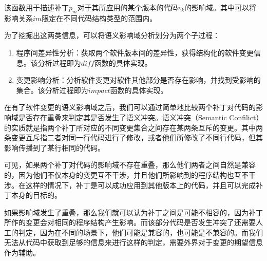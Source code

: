 该函数用于描述补丁$p_m$对于其所应用的某个版本的代码$v_k$的影响域。其中可以将影响关系$im$限定在不同代码结构类型的范围内。

为了挖掘出这两类信息，可以将语义影响域分析划分为两个子过程：
\begin{enumerate}
	\item 程序间差异性分析：获取两个软件版本间的差异性，获得结构化的软件变更信息。该分析过程即为$diff$函数的具体实现。
	\item 变更影响分析：分析软件变更对软件其他部分是否存在影响，并找到受影响的集合。该分析过程即为$impact$函数的具体实现。
\end{enumerate}



在有了软件变更的语义影响域之后，我们可以通过简单地比较两个补丁对代码的影响域是否存在重叠来判定其是否发生了语义冲突。语义冲突（Semantic Confilict）的实质就是指两个补丁所对应的不同变更集合之间存在某两条互斥的变更。其中两条变更互斥指二者对同一行代码进行了修改，或者他们所修改了不同行代码，但其影响传播到了某行相同的代码。

%	



可见，如果两个补丁对代码的影响域不存在重叠，那么他们两者之间自然是兼容的，因为他们不仅本身的变更互不干涉，并且他们所影响到的程序结构也互不干涉。在这样的情况下，补丁是可以成功应用到其他版本上的代码，并且可以完成补丁本身的目标的。

如果影响域发生了重叠，那么我们就可以认为补丁之间是可能不相容的，因为补丁所作的变更会对相同的程序结构产生影响。而该部分代码是否发生冲突了还需要人工的判定，因为在不同的场景下，他们可能是兼容的，也可能是不兼容的。而我们无法从代码中获取到足够的信息来进行这样的判定，需要外界对于变更的期望信息作为辅助。

%


